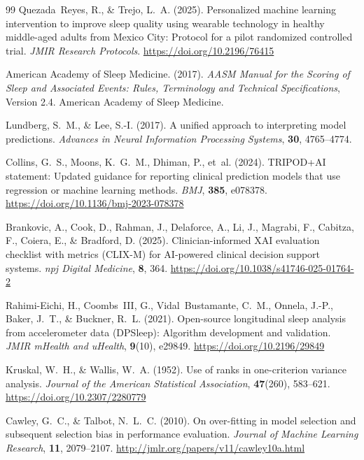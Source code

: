 \documentclass[fleqn,10pt]{wlscirep}
\begin{document}
\begin{thebibliography}{99}
Quezada~Reyes, R., \& Trejo, L.~A. (2025). Personalized machine learning intervention to improve sleep quality using wearable technology in healthy middle-aged adults from Mexico City: Protocol for a pilot randomized controlled trial. \textit{JMIR Research Protocols}. \url{https://doi.org/10.2196/76415}

American Academy of Sleep Medicine. (2017). \textit{AASM Manual for the Scoring of Sleep and Associated Events: Rules, Terminology and Technical Specifications}, Version 2.4. American Academy of Sleep Medicine.

Lundberg, S.~M., \& Lee, S.-I. (2017). A unified approach to interpreting model predictions. \textit{Advances in Neural Information Processing Systems}, \textbf{30}, 4765--4774.

Collins, G.~S., Moons, K.~G.~M., Dhiman, P., et~al. (2024). TRIPOD+AI statement: Updated guidance for reporting clinical prediction models that use regression or machine learning methods. \textit{BMJ}, \textbf{385}, e078378. \url{https://doi.org/10.1136/bmj-2023-078378}

Brankovic, A., Cook, D., Rahman, J., Delaforce, A., Li, J., Magrabi, F., Cabitza, F., Coiera, E., \& Bradford, D. (2025). Clinician-informed XAI evaluation checklist with metrics (CLIX-M) for AI-powered clinical decision support systems. \textit{npj Digital Medicine}, \textbf{8}, 364. \url{https://doi.org/10.1038/s41746-025-01764-2}

Rahimi-Eichi, H., Coombs~III, G., Vidal~Bustamante, C.~M., Onnela, J.-P., Baker, J.~T., \& Buckner, R.~L. (2021). Open-source longitudinal sleep analysis from accelerometer data (DPSleep): Algorithm development and validation. \textit{JMIR mHealth and uHealth}, \textbf{9}(10), e29849. \url{https://doi.org/10.2196/29849}

Kruskal, W.~H., \& Wallis, W.~A. (1952). Use of ranks in one-criterion variance analysis. \textit{Journal of the American Statistical Association}, \textbf{47}(260), 583--621. \url{https://doi.org/10.2307/2280779}

Cawley, G.~C., \& Talbot, N.~L.~C. (2010). On over-fitting in model selection and subsequent selection bias in performance evaluation. \textit{Journal of Machine Learning Research}, \textbf{11}, 2079--2107. \url{http://jmlr.org/papers/v11/cawley10a.html}

\end{thebibliography}
\end{document}
